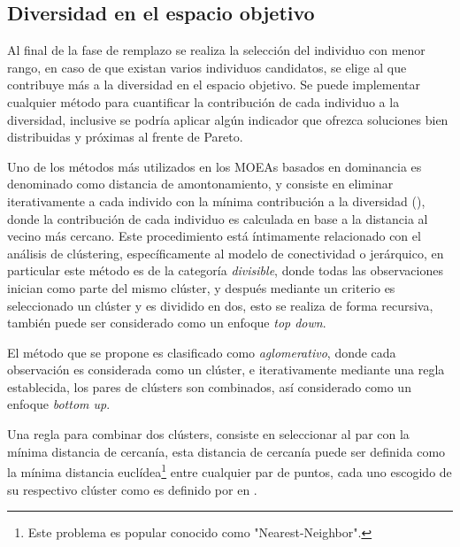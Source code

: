 \subsection*{Diversidad en el espacio objetivo}

Al final de la fase de remplazo se realiza la selección del individuo con menor rango, en caso de que existan varios individuos candidatos, se elige al que contribuye más a la diversidad en el espacio objetivo.
%
Se puede implementar cualquier método para cuantificar la contribución de cada individuo a la diversidad, inclusive se podría aplicar algún indicador que ofrezca soluciones bien distribuidas y próximas al frente de Pareto.
%

Uno de los métodos más utilizados en los MOEAs basados en dominancia es denominado como distancia de amontonamiento, y consiste en eliminar iterativamente a cada individo con la mínima contribución a la diversidad (\cite{Joel:NSGAII}), donde la contribución de cada individuo es calculada en base a la distancia al vecino más cercano.
%
Este procedimiento está íntimamente relacionado con el análisis de clústering, específicamente al modelo de conectividad o jerárquico, en particular este método es de la categoría \textit{divisible}, donde todas las observaciones inician como parte del mismo clúster, y después mediante un criterio es seleccionado un clúster y es dividido en dos, esto se realiza de forma recursiva, también puede ser considerado como un enfoque \textit{top down}.
%

El método que se propone es clasificado como \textit{aglomerativo}, donde cada observación es considerada como un clúster, e iterativamente mediante una regla establecida, los pares de clústers son combinados, así considerado como un enfoque \textit{bottom up}.

%
Una regla para combinar dos clústers, consiste en seleccionar al par con la mínima distancia de cercanía, esta distancia de cercanía puede ser definida como la mínima distancia euclídea\footnote{Este problema es popular conocido como "Nearest-Neighbor".} entre cualquier par de puntos, cada uno escogido de su respectivo clúster como es definido por \citeauthor{Joel:leskovec2014mining} en .
%

